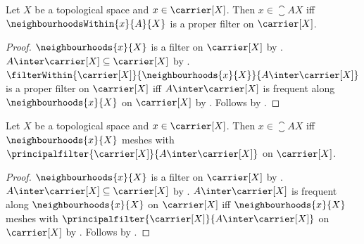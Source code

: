 \begin{theorem}\label{closure_iff_neighbourhoods_within_proper}
    Let $X$ be a topological space and $x\in\carrier[X]$.
    Then $x\in\closure{A}{X}$ iff
        $\neighbourhoodsWithin{x}{A}{X}$ is a proper filter on
        $\carrier[X]$.
\end{theorem}
\begin{proof}
    $\neighbourhoods{x}{X}$ is a filter on $\carrier[X]$ by
        .
    $A\inter\carrier[X]\subseteq\carrier[X]$ by
        .
    $\filterWithin{\carrier[X]}{\neighbourhoods{x}{X}}{
        A\inter\carrier[X]}$ is a proper filter on $\carrier[X]$ iff
        $A\inter\carrier[X]$ is frequent along
            $\neighbourhoods{x}{X}$ on $\carrier[X]$ by
        .
    Follows by
        .
\end{proof}

\begin{theorem}\label{closure_iff_neighbourhood_meshes_principal}
    Let $X$ be a topological space and $x\in\carrier[X]$.
    Then $x\in\closure{A}{X}$ iff
        $\neighbourhoods{x}{X}$ meshes with
        $\principalfilter{\carrier[X]}{A\inter\carrier[X]}$ on
        $\carrier[X]$.
\end{theorem}
\begin{proof}
    $\neighbourhoods{x}{X}$ is a filter on $\carrier[X]$ by
        .
    $A\inter\carrier[X]\subseteq\carrier[X]$ by
        .
    $A\inter\carrier[X]$ is frequent along
        $\neighbourhoods{x}{X}$ on $\carrier[X]$ iff
        $\neighbourhoods{x}{X}$ meshes with
        $\principalfilter{\carrier[X]}{A\inter\carrier[X]}$ on
        $\carrier[X]$ by .
    Follows by .
\end{proof}
